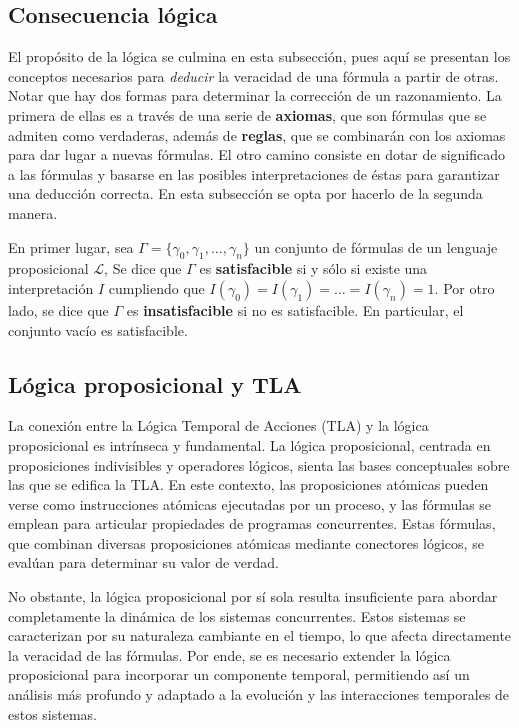 \subsection{Consecuencia lógica}\label{subsection:lpropconsec}
El propósito de la lógica se culmina en esta subsección, pues aquí se presentan los conceptos necesarios para \textit{deducir} la veracidad de una fórmula a partir de otras. Notar que hay dos formas para determinar la corrección de un razonamiento. La primera de ellas es a través de una serie de \textbf{axiomas}, que son fórmulas que se admiten como verdaderas, además de \textbf{reglas}, que se combinarán con los axiomas para dar lugar a nuevas fórmulas. El otro camino consiste en dotar de significado a las fórmulas y basarse en las posibles interpretaciones de éstas para garantizar una deducción correcta. En esta subsección se opta por hacerlo de la segunda manera.

En primer lugar, sea $\Gamma = \lbrace \gamma_0, \gamma_1, \ldots, \gamma_n \rbrace$ un conjunto de fórmulas de un lenguaje proposicional $\mathcal{L}$, Se dice que $\Gamma$ es \textbf{satisfacible} si y sólo si existe una interpretación $I$ cumpliendo que $I(\gamma_0) = I(\gamma_1) = \ldots = I(\gamma_n) = 1$. Por otro lado, se dice que $\Gamma$ es \textbf{insatisfacible} si no es satisfacible. En particular, el conjunto vacío es satisfacible.

\subsection{Lógica proposicional y TLA}\label{subsection:lpropTLA}
La conexión entre la Lógica Temporal de Acciones (TLA) y la lógica proposicional es intrínseca y fundamental. La lógica proposicional, centrada en proposiciones indivisibles y operadores lógicos, sienta las bases conceptuales sobre las que se edifica la TLA. En este contexto, las proposiciones atómicas pueden verse como instrucciones atómicas ejecutadas por un proceso, y las fórmulas se emplean para articular propiedades de programas concurrentes. Estas fórmulas, que combinan diversas proposiciones atómicas mediante conectores lógicos, se evalúan para determinar su valor de verdad.

No obstante, la lógica proposicional por sí sola resulta insuficiente para abordar completamente la dinámica de los sistemas concurrentes. Estos sistemas se caracterizan por su naturaleza cambiante en el tiempo, lo que afecta directamente la veracidad de las fórmulas. Por ende, se es necesario extender la lógica proposicional para incorporar un componente temporal, permitiendo así un análisis más profundo y adaptado a la evolución y las interacciones temporales de estos sistemas.

